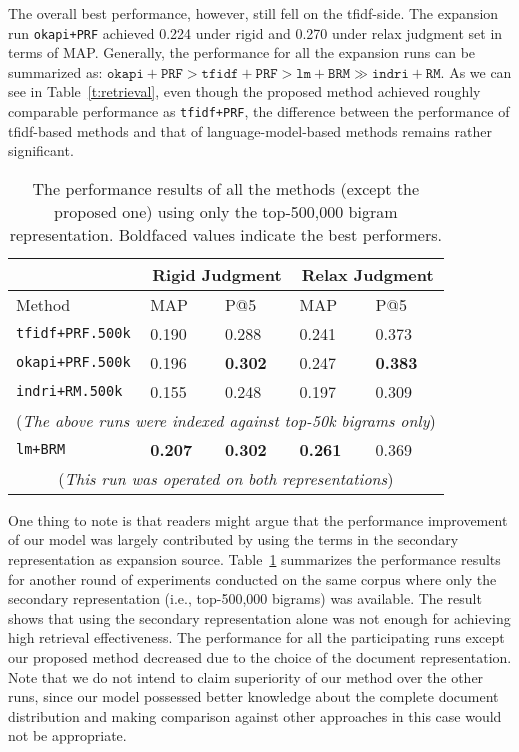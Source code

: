 The overall best performance, however, still fell on the tfidf-side.  The
expansion run {\tt okapi+PRF} achieved 0.224 under rigid and 0.270 under relax
judgment set in terms of MAP.  Generally, the performance for all the expansion
runs can be summarized as: $\mathtt{okapi+PRF} > \mathtt{tfidf+PRF} >
\mathtt{lm+BRM} \gg \mathtt{indri+RM}$.  As we can see in
Table~\ref{t:retrieval}, even though the proposed method achieved roughly
comparable performance as {\tt tfidf+PRF}, the difference between the
performance of tfidf-based methods and that of language-model-based methods
remains rather significant.  

\begin{table}[ht!]
  \caption{The performance results of all the methods (except the proposed one)
  using only the top-500,000 bigram representation.  Boldfaced values indicate the
  best performers.} \label{t:retrieval.500k}
  \centering
  \begin{tabular}{p{3cm}p{1.5cm}p{1.5cm}p{1.5cm}p{1.5cm}}
    & \multicolumn{2}{c}{Rigid Judgment} & \multicolumn{2}{c}{Relax Judgment} \\
    \hline
    Method & MAP & P@5 & MAP & P@5 \\
    \hline
    {\tt tfidf+PRF.500k} & 0.190 & 0.288 & 0.241 & 0.373 \\
    {\tt okapi+PRF.500k} & 0.196 & {\bf 0.302} & 0.247 & {\bf 0.383} \\
    {\tt indri+RM.500k} & 0.155 & 0.248 & 0.197 & 0.309 \\
    \multicolumn{5}{c}{({\it The above runs were indexed against top-50k bigrams only})} \\
    \hline
    {\tt lm+BRM} & {\bf 0.207} & {\bf 0.302} & {\bf 0.261} & 0.369 \\
    \multicolumn{5}{c}{({\it This run was operated on both representations})}
  \end{tabular}
\end{table}

One thing to note is that readers might argue that the performance improvement
of our model was largely contributed by using the terms in the secondary
representation as expansion source.  Table~\ref{t:retrieval.500k} summarizes
the performance results for another round of experiments conducted on the same
corpus where only the secondary representation (i.e., top-500,000 bigrams) was
available.  The result shows that using the secondary representation alone was
not enough for achieving high retrieval effectiveness.  The performance for all
the participating runs except our proposed method decreased due to the choice
of the document representation.  Note that we do not intend to claim
superiority of our method over the other runs, since our model possessed better
knowledge about the complete document distribution and making comparison
against other approaches in this case would not be appropriate.

